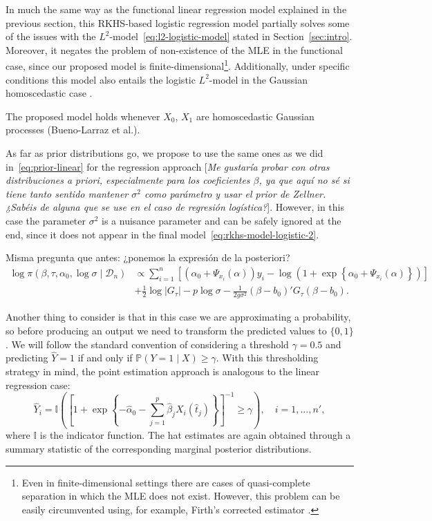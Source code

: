 \documentclass[ba]{imsart}
\numberwithin{equation}{section}
\theoremstyle{plain}
\newenvironment{comment}[1][comment-red]
{
\noindent \color{#1}
}
{
\color{black}
}
\newcommand\incomment[2][comment-red]{\color{#1}[\textit{#2}]\color{black}}
\begin{document}
In much the same way as the functional linear regression model explained in the previous section, this RKHS-based logistic regression model partially solves some of the issues with the \(L^2\)-model~\eqref{eq:l2-logistic-model} stated in Section~\ref{sec:intro}. Moreover, it negates the problem of non-existence of the MLE in the functional case, since our proposed model is finite-dimensional\footnote{Even in finite-dimensional settings there are cases of quasi-complete separation in which the MLE does not exist. However, this problem can be easily circumvented using, for example, Firth's corrected estimator \citep{firth1993bias}.}. Additionally, under specific conditions this model also entails the logistic \(L^2\)-model in the Gaussian homoscedastic case \citep[see][Th.~1]{berrendero2021functional}.

\begin{comment}
  The proposed model holds whenever \(X_0\), \(X_1\) are homoscedastic Gaussian processes (Bueno-Larraz et al.).
\end{comment}

As far as prior distributions go, we propose to use the same ones as we did in~\eqref{eq:prior-linear} for the regression approach \incomment{Me gustaría probar con otras distribuciones a priori, especialmente para los coeficientes \(\beta\), ya que aquí no sé si tiene tanto sentido mantener \(\sigma^2\) como parámetro y usar el prior de Zellner. ¿Sabéis de alguna que se use en el caso de regresión logística?}. However, in this case the parameter \(\sigma^2\) is a nuisance parameter and can be safely ignored at the end, since it does not appear in the final model~\eqref{eq:rkhs-model-logistic-2}.

\begin{comment}
  Misma pregunta que antes: ¿ponemos la expresión de la posteriori?
  \begin{align*}
\log \pi(\beta, \tau, \alpha_0, \log\sigma\mid \mathcal D_n) & \propto \sum_{i=1}^n \left[ \left(\alpha_0 + \Psi_{x_i}(\alpha)\right)y_i - \log\left(1 + \exp\left\{\alpha_0 + \Psi_{x_i}(\alpha)\right\}\right)\right]\\
\quad &+ \frac{1}{2}\log |G_\tau| - p\log \sigma -\frac{1}{2g\sigma^2} (\beta - b_0)'G_\tau(\beta - b_0).
\end{align*}

\end{comment}

Another thing to consider is that in this case we are approximating a probability, so before producing an output we need to transform the predicted values to \(\{0, 1\}\). We will follow the standard convention of considering a threshold \(\gamma = 0.5\) and predicting \(\hat Y=1\) if and only if \(\mathbb P(Y=1\mid X) \geq \gamma\). With this thresholding strategy in mind, the point estimation approach is analogous to the linear regression case:
\[
\hat Y_i = \mathbb I \left( \left[\displaystyle 1 + \exp\left\{-\hat\alpha_0 - \sum_{j=1}^p \hat\beta_j X_i(\hat t_j)\right\}\right]^{-1} \geq \gamma \right), \quad i=1,\dots,n',
\]
where \(\mathbb I\) is the indicator function. The hat estimates are again obtained through a summary statistic of the corresponding marginal posterior distributions.
\end{document}
